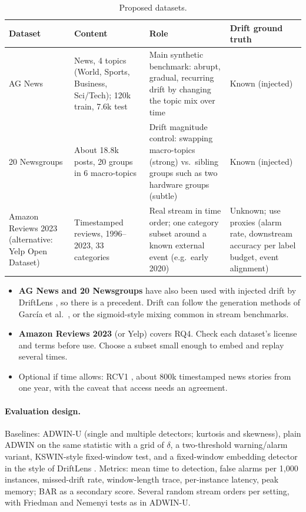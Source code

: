 \documentclass[11pt,a4paper]{article}
\begin{document}
\begin{table}[h]
\centering
\small
\caption{Proposed datasets.}
\label{tab:datasets}
\begin{tabular}{p{2.5cm}p{3.0cm}p{4.2cm}p{3.6cm}}
\toprule
Dataset & Content & Role & Drift ground truth \\
\midrule
AG News \cite{zhang2015} & News, 4 topics (World, Sports, Business, Sci/Tech); 120k train, 7.6k test & Main synthetic benchmark: abrupt, gradual, recurring drift by changing the topic mix over time & Known (injected) \\
20 Newsgroups \cite{lang1995} & About 18.8k posts, 20 groups in 6 macro-topics & Drift magnitude control: swapping macro-topics (strong) vs.\ sibling groups such as two hardware groups (subtle) & Known (injected) \\
Amazon Reviews 2023 \cite{hou2024} (alternative: Yelp Open Dataset) & Timestamped reviews, 1996--2023, 33 categories & Real stream in time order; one category subset around a known external event (e.g.\ early 2020) & Unknown; use proxies (alarm rate, downstream accuracy per label budget, event alignment) \\
\bottomrule
\end{tabular}
\end{table}

\begin{itemize}
\item \textbf{AG News and 20 Newsgroups} have also been used with injected drift by DriftLens \cite{greco2024}, so there is a precedent. Drift can follow the generation methods of García et al.\ \cite{garcia2024gen}, or the sigmoid-style mixing common in stream benchmarks.
\item \textbf{Amazon Reviews 2023} (or Yelp) covers RQ4. Check each dataset's license and terms before use. Choose a subset small enough to embed and replay several times.
\item Optional if time allows: RCV1 \cite{lewis2004}, about 800k timestamped news stories from one year, with the caveat that access needs an agreement.
\end{itemize}

\paragraph{Evaluation design.}
Baselines: ADWIN-U (single and multiple detectors; kurtosis and skewness), plain ADWIN on the same statistic with a grid of $\delta$, a two-threshold warning/alarm variant, KSWIN-style fixed-window test, and a fixed-window embedding detector in the style of DriftLens \cite{greco2024}. Metrics: mean time to detection, false alarms per 1,000 instances, missed-drift rate, window-length trace, per-instance latency, peak memory; BAR as a secondary score. Several random stream orders per setting, with Friedman and Nemenyi tests as in ADWIN-U.
\end{document}
